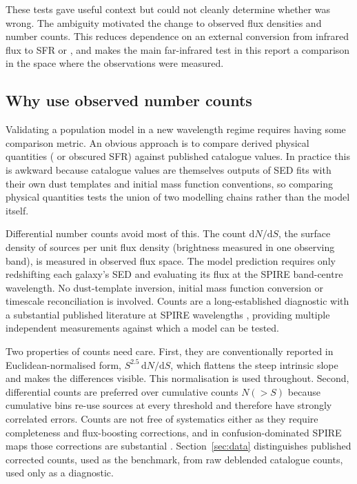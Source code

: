 \documentclass[12pt,a4paper]{article}
\begin{document}
These tests gave useful context but could not cleanly determine whether \popcosmos{}
was wrong. The ambiguity motivated the change to observed flux densities and number
counts. This reduces dependence on an external conversion from infrared flux to SFR or
\LIR{}, and makes the main far-infrared test in this report a comparison in the space
where the observations were measured.

\subsection{Why use observed number counts}
\label{sec:intro:counts}

Validating a population model in a new wavelength regime requires having some comparison
metric. An obvious approach is to compare derived physical quantities (\LIR{} or
obscured SFR) against published catalogue values. In practice this is awkward because catalogue
\LIR{} values are themselves outputs of SED fits with their own dust templates and
initial mass function conventions, so comparing physical quantities tests the union of
two modelling chains rather than the model itself.

Differential number counts avoid most of this. The count $\mathrm{d}N/\mathrm{d}S$, the
surface density of sources per unit flux density (brightness measured in one observing
band), is measured in observed flux space. The model prediction requires only
redshifting each galaxy's SED and evaluating its flux at the SPIRE band-centre
wavelength. No dust-template inversion, initial mass function conversion or timescale
reconciliation is involved. Counts are a long-established diagnostic with a substantial
published literature at SPIRE wavelengths \citep{Clements_2010, Oliver_2010,
Glenn_2010, B_thermin_2010}, providing multiple independent measurements against which a
model can be tested.

Two properties of counts need care. First, they are conventionally reported in
Euclidean-normalised form, $S^{2.5}\,\mathrm{d}N/\mathrm{d}S$, which flattens the
steep intrinsic slope and makes the differences visible. This normalisation is used
throughout. Second, differential counts are preferred over cumulative counts $N(>S)$
because cumulative bins re-use sources at every threshold and therefore have strongly
correlated errors. Counts are not free of systematics either as they require completeness
and flux-boosting corrections, and in confusion-dominated SPIRE maps those corrections
are substantial \citep{Nguyen_2010, Roseboom_2010}.
Section~\ref{sec:data} distinguishes published corrected counts, used as
the benchmark, from raw deblended catalogue counts, used only as a diagnostic.
\end{document}
